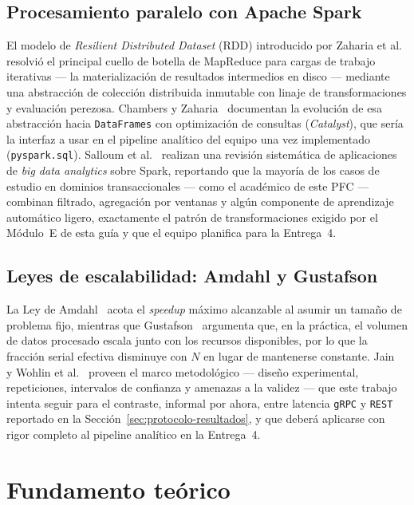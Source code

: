 \documentclass[12pt,a4paper]{article}
\begin{document}
\subsection{Procesamiento paralelo con Apache Spark}

El modelo de \emph{Resilient Distributed Dataset} (RDD) introducido por
Zaharia et al.~\cite{zaharia2012rdd} resolvió el principal cuello de botella
de MapReduce para cargas de trabajo iterativas --- la materialización de
resultados intermedios en disco --- mediante una abstracción de colección
distribuida inmutable con linaje de transformaciones y evaluación perezosa.
Chambers y Zaharia~\cite{chambers2018spark} documentan la evolución de esa
abstracción hacia \texttt{DataFrames} con optimización de consultas
(\emph{Catalyst}), que sería la interfaz a usar en el pipeline analítico del
equipo una vez implementado (\texttt{pyspark.sql}). Salloum et al.~\cite{salloum2016bigdata}
realizan una revisión sistemática de aplicaciones de \emph{big data
analytics} sobre Spark, reportando que la mayoría de los casos de estudio en
dominios transaccionales --- como el académico de este PFC --- combinan
filtrado, agregación por ventanas y algún componente de aprendizaje
automático ligero, exactamente el patrón de transformaciones exigido por el
Módulo~E de esta guía y que el equipo planifica para la Entrega~4.

\subsection{Leyes de escalabilidad: Amdahl y Gustafson}

La Ley de Amdahl~\cite{amdahl1967validity} acota el \emph{speedup} máximo
alcanzable al asumir un tamaño de problema fijo, mientras que Gustafson~\cite{gustafson1988reevaluating}
argumenta que, en la práctica, el volumen de datos procesado escala junto
con los recursos disponibles, por lo que la fracción serial efectiva
disminuye con $N$ en lugar de mantenerse constante. Jain~\cite{jain1991art}
y Wohlin et al.~\cite{wohlin2012experimentation} proveen el marco
metodológico --- diseño experimental, repeticiones, intervalos de confianza
y amenazas a la validez --- que este trabajo intenta seguir para el
contraste, informal por ahora, entre latencia \texttt{gRPC} y \texttt{REST}
reportado en la Sección~\ref{sec:protocolo-resultados}, y que deberá
aplicarse con rigor completo al pipeline analítico en la Entrega~4.


\section{Fundamento teórico}
\label{sec:fundamento-teorico}
\end{document}
